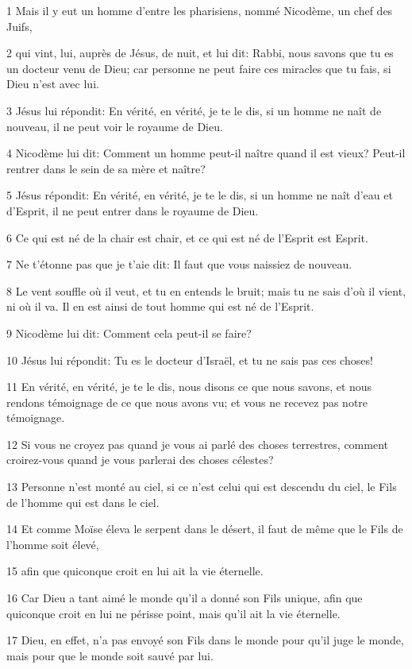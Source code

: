 \par 1 Mais il y eut un homme d'entre les pharisiens, nommé Nicodème, un chef des Juifs,
\par 2 qui vint, lui, auprès de Jésus, de nuit, et lui dit: Rabbi, nous savons que tu es un docteur venu de Dieu; car personne ne peut faire ces miracles que tu fais, si Dieu n'est avec lui.
\par 3 Jésus lui répondit: En vérité, en vérité, je te le dis, si un homme ne naît de nouveau, il ne peut voir le royaume de Dieu.
\par 4 Nicodème lui dit: Comment un homme peut-il naître quand il est vieux? Peut-il rentrer dans le sein de sa mère et naître?
\par 5 Jésus répondit: En vérité, en vérité, je te le dis, si un homme ne naît d'eau et d'Esprit, il ne peut entrer dans le royaume de Dieu.
\par 6 Ce qui est né de la chair est chair, et ce qui est né de l'Esprit est Esprit.
\par 7 Ne t'étonne pas que je t'aie dit: Il faut que vous naissiez de nouveau.
\par 8 Le vent souffle où il veut, et tu en entends le bruit; mais tu ne sais d'où il vient, ni où il va. Il en est ainsi de tout homme qui est né de l'Esprit.
\par 9 Nicodème lui dit: Comment cela peut-il se faire?
\par 10 Jésus lui répondit: Tu es le docteur d'Israël, et tu ne sais pas ces choses!
\par 11 En vérité, en vérité, je te le dis, nous disons ce que nous savons, et nous rendons témoignage de ce que nous avons vu; et vous ne recevez pas notre témoignage.
\par 12 Si vous ne croyez pas quand je vous ai parlé des choses terrestres, comment croirez-vous quand je vous parlerai des choses célestes?
\par 13 Personne n'est monté au ciel, si ce n'est celui qui est descendu du ciel, le Fils de l'homme qui est dans le ciel.
\par 14 Et comme Moïse éleva le serpent dans le désert, il faut de même que le Fils de l'homme soit élevé,
\par 15 afin que quiconque croit en lui ait la vie éternelle.
\par 16 Car Dieu a tant aimé le monde qu'il a donné son Fils unique, afin que quiconque croit en lui ne périsse point, mais qu'il ait la vie éternelle.
\par 17 Dieu, en effet, n'a pas envoyé son Fils dans le monde pour qu'il juge le monde, mais pour que le monde soit sauvé par lui.
